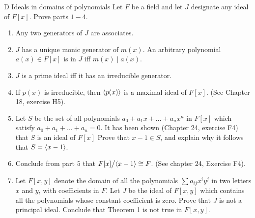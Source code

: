 \begin{exercise}{D Ideals in domains of polynomials}
Let $F$ be a field and let $J$ designate any ideal of $F[x]$. Prove parts $1-4$.
\begin{enumerate}
    \item Any two generators of $J$ are associates.
    \item $J$ has a unique monic generator of $m(x)$. An arbitrary polynomial $a(x)\in F[x]$ is in $J$ iff $m(x)\mid a(x)$.
    \item $J$ is a prime ideal iff it has an irreducible generator.
    \item If $p(x)$ is irreducible, then $\left\langle p(x)\right\rangle$ is a maximal ideal of $F[x]$. (See Chapter 18, exercise H5).
    \item Let $S$ be the set of all polynomials $a_0+a_1x+\dots+a_nx^n$ in $F[x]$ which satisfy $a_0+a_1+\dots+a_n=0$. It has been shown (Chapter 24, exercise F4) that $S$ is an ideal of $F[x]$ Prove that $x-1\in S$, and explain why it follows that $S=\left\langle x-1\right\rangle$.
    \item Conclude from part $5$ that ${\textstyle F[x]}\big/{\textstyle \left\langle x-1\right\rangle}\cong F$. (See chapter 24, Exercise F4).
    \item Let $F[x,y]$ denote the domain of all the polynomials $\sum a_{ij}x^iy^j$ in two letters $x$ and $y$, with coefficients in $F$. Let $J$ be the ideal of $F[x,y]$ which contains all the polynomials whose constant coefficient is zero. Prove that $J$ is not a principal ideal. Conclude that Theorem 1 is not true in $F[x,y]$.
\end{enumerate}
\end{exercise}
